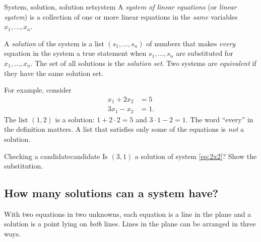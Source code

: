 \documentclass[11pt]{article}
\begin{document}
\begin{defn}{System, solution, solution set}{system}
A \emph{system of linear equations} (or \emph{linear system}) is a collection of one or more
linear equations in the \emph{same} variables $x_1,\dots,x_n$.
 
A \emph{solution} of the system is a list $(s_1,\dots,s_n)$ of numbers that makes \emph{every}
equation in the system a true statement when $s_1,\dots,s_n$ are substituted for
$x_1,\dots,x_n$. The set of all solutions is the \emph{solution set}. Two systems are
\emph{equivalent} if they have the same solution set.
\end{defn}
 
For example, consider
\begin{equation}\label{eq:2x2}
\begin{aligned}
x_1+2x_2&=5\\
3x_1-x_2&=1.
\end{aligned}
\end{equation}
The list $(1,2)$ is a solution: $1+2\cdot2=5$ and $3\cdot1-2=1$. The word ``every'' in the
definition matters. A list that satisfies only some of the equations is \emph{not} a solution.
 
\begin{kc}{Checking a candidate}{candidate}
Is $(3,1)$ a solution of system \eqref{eq:2x2}? Show the substitution.
\end{kc}
 
\subsection*{How many solutions can a system have?}
 
With two equations in two unknowns, each equation is a line in the plane and a solution is a
point lying on \emph{both} lines. Lines in the plane can be arranged in three ways.
 
\end{document}
